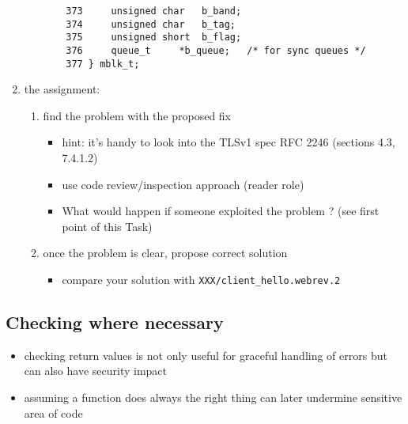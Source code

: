 \begin{enumerate}
\begin{itemize}
\begin{verbatim}
    373 	unsigned char	b_band;
    374 	unsigned char	b_tag;
    375 	unsigned short	b_flag;
    376 	queue_t		*b_queue;	/* for sync queues */
    377 } mblk_t;
\end{verbatim}
  \end{itemize}
   \item the assignment:
   \begin{enumerate}
        \item find the problem with the proposed fix
        \begin{itemize}
          \item hint: it's handy to look into the TLSv1 spec RFC 2246
                  (sections 4.3, 7.4.1.2)
          \item use code review/inspection approach (reader role)
	  \item What would happen if someone exploited the problem ?
	    (see first point of this Task)
        \end{itemize}
	\item once the problem is clear, propose correct solution
          \begin{itemize}
	  \item compare your solution with \texttt{XXX/client\_hello.webrev.2}
          \end{itemize}
   \end{enumerate}
\end{enumerate}


\subsection{Checking where necessary}

\begin{itemize}
  \item checking return values is not only useful for graceful handling of
    errors but can also have security impact
  \item assuming a function does always the right thing can later undermine
    sensitive area of code
\end{itemize}


